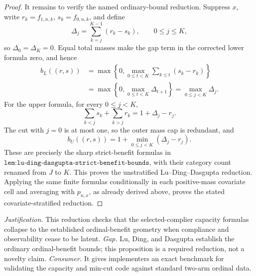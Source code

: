 \documentclass{article}
\begin{document}
\begin{proof}
It remains to verify the named ordinary-bound reduction.  Suppress \(x\), write
\(r_k=f_{1,n,k}\), \(s_k=f_{0,n,k}\), and define
\[
\Delta_j=\sum_{k=j}^{K-1}(r_k-s_k),
\qquad 0\le j\le K,
\]
so \(\Delta_0=\Delta_K=0\).  Equal total masses make the gap term in the corrected lower formula zero, and hence
\[
\begin{aligned}
b_L((r,s))
&=\max\left\{0,\max_{0\le t<K}\sum_{k\le t}(s_k-r_k)\right\}\\
&=\max\left\{0,\max_{0\le t<K}\Delta_{t+1}\right\}
=\max_{0\le j<K}\Delta_j.
\end{aligned}
\]
For the upper formula, for every \(0\le j<K\),
\[
\sum_{k<j}s_k+\sum_{k>j}r_k
=1+\Delta_j-r_j.
\]
The cut with \(j=0\) is at most one, so the outer mass cap is redundant, and
\[
b_U((r,s))
=1+\min_{0\le j<K}(\Delta_j-r_j).
\]
These are precisely the sharp strict-benefit formulas in \(\texttt{lem:lu-ding-dasgupta-strict-benefit-bounds}\), with their category count renamed from \(J\) to \(K\).  This proves the unstratified Lu--Ding--Dasgupta reduction.  Applying the same finite formulas conditionally in each positive-mass covariate cell and averaging with \(p_{n,x}\), as already derived above, proves the stated covariate-stratified reduction.
\end{proof}
\par\smallskip\noindent \textit{Justification.} This reduction checks that the selected-complier capacity formulas collapse to the established ordinal-benefit geometry when compliance and observability cease to be latent. \textit{Gap.} Lu, Ding, and Dasgupta establish the ordinary ordinal-benefit bounds; this proposition is a required reduction, not a novelty claim. \textit{Consumer.} It gives implementers an exact benchmark for validating the capacity and min-cut code against standard two-arm ordinal data.
\end{document}
